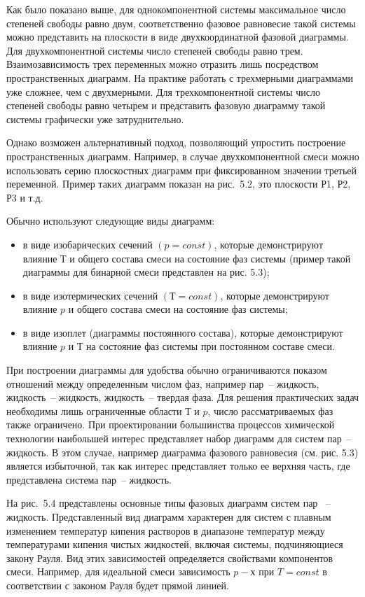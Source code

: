 Как было показано выше, для однокомпонентной системы максимальное число степеней свободы равно двум, соответственно фазовое равновесие такой системы можно представить на плоскости в виде двухкоординатной фазовой диаграммы. Для двухкомпонентной системы число степеней свободы равно трем. Взаимозависимость трех переменных можно отразить лишь посредством пространственных диаграмм. На практике работать с трехмерными диаграммами уже сложнее, чем с двухмерными. Для трехкомпонентной системы число степеней свободы равно четырем и представить фазовую диаграмму такой системы графически уже затруднительно. 

Однако возможен альтернативный подход, позволяющий упростить построение пространственных диаграмм. Например, в случае двухкомпонентной смеси можно использовать серию плоскостных диаграмм при фиксированном значении третьей переменной. Пример таких диаграмм показан на рис. 5.2, это плоскости Р1, Р2, Р3 и т.д.

Обычно используют следующие виды диаграмм:
\begin{itemize}
\item в виде изобарических сечений $(p = const)$, которые демонстрируют влияние $Т$ и общего состава смеси на состояние фаз системы (пример такой диаграммы для бинарной смеси представлен на рис. 5.3); 
\item в виде изотермических сечений $(Т = const)$, которые демонстрируют влияние $p$ и общего состава смеси на состояние фаз системы;
\item в виде изоплет (диаграммы постоянного состава), которые демонстрируют влияние $p$ и $Т$ на состояние фаз системы при постоянном составе смеси.	
\end{itemize} 

При построении диаграммы для удобства обычно ограничиваются показом отношений между определенным числом фаз, например пар~-- жидкость, жидкость~-- жидкость, жидкость~-- твердая фаза. Для решения практических задач необходимы лишь ограниченные области $Т$ и $p$, число рассматриваемых фаз также ограничено. При проектировании большинства процессов химической технологии наибольшей интерес представляет набор диаграмм для систем пар~-- жидкость. В этом случае, например диаграмма фазового равновесия (см. рис. 5.3) является избыточной, так как интерес представляет только ее верхняя часть, где представлена система пар~-- жидкость. 

На рис. 5.4 представлены основные типы фазовых диаграмм систем пар ~-- жидкость. Представленный вид диаграмм характерен для систем с плавным изменением температур кипения растворов в диапазоне температур между температурами кипения чистых жидкостей, включая системы, подчиняющиеся закону Рауля. Вид этих зависимостей определяется свойствами компонентов смеси. Например, для идеальной смеси зависимость $p-х$ при $T=const$ в соответствии с законом Рауля будет прямой линией.


